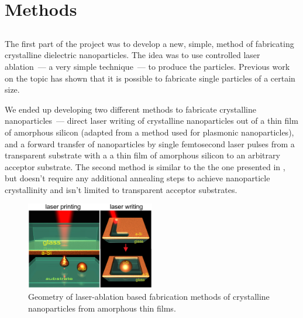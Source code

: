 \section{Methods}
\label{ch:Exp}

    \subsection{}
    \label{sec:Ablation}
            The first part of the project was to develop a new, simple, method of fabricating crystalline dielectric
        nanoparticles. The idea was to use controlled laser ablation~--- a very simple technique~--- to produce the particles.
        Previous work on the topic\cite{kuznetsov2012magnetic, zywietz2014laser} has shown that it is possible to fabricate single particles
        of a certain size.

            We ended up developing two different methods to fabricate crystalline nanoparticles~--- direct laser writing of crystalline
        nanoparticles out of a thin film of amorphous silicon (adapted from a method used for plasmonic nanoparticles\cite{makarov2016controllable,
        dmitriev2016direct}), and a forward transfer of nanoparticles by single femtosecond laser pulses
        from a transparent substrate with a a thin film of amorphous silicon to an arbitrary acceptor substrate. The second method is
        similar to the the one presented in \cite{zywietz2014laser}, but doesn't require any additional annealing steps to achieve
        nanoparticle crystallinity and isn't limited to transparent acceptor substrates.

        \begin{figure}[h!]
                \begin{center}
                    \includegraphics[width=0.5\textwidth]{figs/methods/LaserPrinting.eps}
                \end{center}
                \caption{Geometry of laser-ablation based fabrication methods of crystalline nanoparticles from amorphous
                            thin films.}
                \label{fig:LaserPrinting}
        \end{figure}

